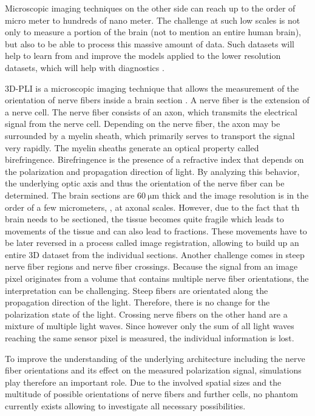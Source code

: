 Microscopic imaging techniques on the other side can reach up to the order of micro meter to hundreds of nano meter.
The challenge at such low scales is not only to measure a portion of the brain (not to mention an entire human brain), but also to be able to process this massive amount of data.
Such datasets will help to learn from and improve the models applied to the lower resolution datasets, which will help with \eg{} diagnostics \cite{Yendiki2021}.
\par
% 
\ac{3D-PLI} is a microscopic imaging technique that allows the measurement of the orientation of nerve fibers inside a brain section \cite{Axer2011a, Axer2011, Axer2016}.
A nerve fiber is the extension of a nerve cell.
The nerve fiber consists of an axon, which transmits the electrical signal from the nerve cell.
Depending on the nerve fiber, the axon may be surrounded by a myelin sheath, which primarily serves to transport the signal very rapidly.
The myelin sheaths generate an optical property called birefringence.
Birefringence is the presence of a refractive index that depends on the polarization and propagation direction of light.
By analyzing this behavior, the underlying optic axis and thus the orientation of the nerve fiber can be determined.
The brain sections are $\SI{60}{\micro\meter}$ thick and the image resolution is in the order of a few micrometers, \ie{}, at axonal scales.
However, due to the fact that th brain needs to be sectioned, the tissue becomes quite fragile which leads to movements of the tissue and can also lead to fractions.
These movements have to be later reversed in a process called image registration, allowing to build up an entire 3D dataset from the individual sections.
Another challenge comes in steep nerve fiber regions and nerve fiber crossings.
Because the signal from an image pixel originates from a volume that contains multiple nerve fiber orientations, the interpretation can be challenging.
Steep fibers are \eg{} orientated along the propagation direction of the light.
Therefore, there is no change for the polarization state of the light.
Crossing nerve fibers on the other hand are a mixture of multiple light waves.
Since however only the sum of all light waves reaching the same sensor pixel is measured, the individual information is lost.
\par
% 
To improve the understanding of the underlying architecture including the nerve fiber orientations and its effect on the measured polarization signal, simulations play therefore an important role.
Due to the involved spatial sizes and the multitude of possible orientations of nerve fibers and further cells, no phantom currently exists allowing to investigate all necessary possibilities.
